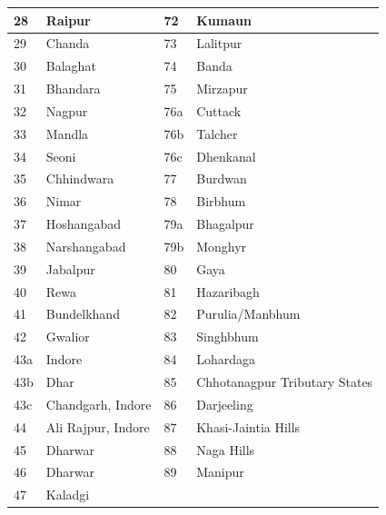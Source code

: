 {\begin{longtable}{|p{.35cm}|p{1.5cm}|p{.35cm}|p{1.9cm}|}
28 & Raipur & 72 & Kumaun \\\hline
29 & Chanda  & 73 & Lalitpur \\\hline
30 & Balaghat & 74 & Banda\\\hline
31 & Bhandara & 75 & Mirzapur \\\hline
32 & Nagpur & 76a & Cuttack\\\hline
33 & Mandla & 76b & Talcher\\\hline
34 & Seoni  & 76c & Dhenkanal\\\hline
35 & Chhindwara  & 77 & Burdwan\\\hline
36 & Nimar & 78 & Birbhum\\\hline
37 & Hoshangabad  & 79a & Bhagalpur\\\hline
38 & Narshangabad & 79b & Monghyr\\\hline
39 & Jabalpur & 80 & Gaya\\\hline
40 & Rewa  & 81 & Hazaribagh\\\hline
41 & Bundelkhand  & 82 & Purulia/Manbhum\\\hline
42 & Gwalior & 83 & Singhbhum\\\hline
43a & Indore  & 84 & Lohardaga\\\hline
43b & Dhar  & 85 & Chhotanagpur Tributary\phantom{} States\\\hline
43c & Chandgarh, Indore  & 86 & Darjeeling\\\hline
44 & Ali Rajpur, Indore & 87 & Khasi-Jaintia Hills\\\hline
45 & Dharwar & 88 & Naga Hills\\\hline
46 & Dharwar & 89 & Manipur\\\hline
47 & Kaladgi &    &  \\\hline
\end{longtable}}

